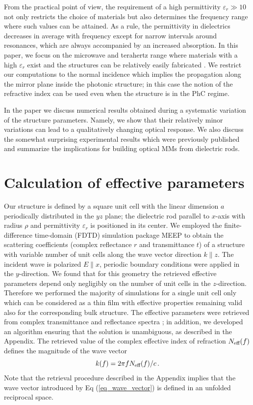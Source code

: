 \documentclass[letterpaper,12pt]{report}
\begin{document}
From the practical point of view, the requirement of a high permittivity $\varepsilon_r
\gg 10$ not only restricts the choice of materials but also determines the frequency
range where such values can be attained. 
\cite{zhao2008tunable,zhao2008experimental}
As a rule, the permittivity in dielectrics
decreases in average with frequency except for narrow intervals around resonances, which
are always accompanied by an increased absorption. In this paper, we focus on the microwave and terahertz
range where materials with a high $\varepsilon_r$ exist and the structures can be relatively easily fabricated
\cite{nemec2012resonant,nemec2009tunable}. We restrict our computations to the normal
incidence which implies the propagation along the mirror plane inside the photonic
structure; in this case the notion of the refractive index can be used even when the
structure is in the PhC regime.

In the paper we discuss numerical results obtained during a systematic variation of the
structure parameters. Namely, we show that their relatively minor variations can lead to
a qualitatively changing optical response. We also discuss the somewhat surprising experimental 
results which were previously published  \cite{peng2007}
and summarize the implications for building optical MMs from dielectric rods.

\section{Calculation of effective parameters}

Our structure is defined by a square unit cell with the linear dimension $a$ periodically
distributed in the $yz$ plane; the dielectric rod parallel to $x$-axis with radius $\rho$
and permittivity $\varepsilon_r$ is positioned in its center. We employed the
finite-difference time-domain (FDTD) simulation package MEEP \cite{oskooi2010meep} to
obtain the scattering coefficients (complex reflectance $r$ and transmittance $t$) of a
structure with variable number of unit cells along the wave vector direction $k\parallel
z$. The incident wave is polarized $E\parallel x$, periodic boundary conditions were
applied in the $y$-direction. We found that for this geometry the retrieved effective
parameters depend only negligibly on the number of unit cells in the $z$-direction.
Therefore we performed the majority of simulations for a single unit cell only which can
be considered as a thin film with effective properties remaining valid also for the
corresponding bulk structure. The effective parameters were retrieved from complex
transmittance and reflectance spectra \cite{smith2002determination}; in addition, we
developed an algorithm ensuring that the solution is unambiguous, as described in the Appendix.
The retrieved value of the complex effective index of refraction $N_{\text{eff} }(f)$ defines the
magnitude of the wave vector
\begin{equation}\label{eq_wave_vector}
k(f) = 2\pi f N_{\text{eff} }(f) /c\,.
\end{equation}
Note that the retrieval procedure described in the Appendix implies that the wave vector
introduced by Eq (\ref{eq_wave_vector}) is defined in an unfolded reciprocal space. 
\end{document}
